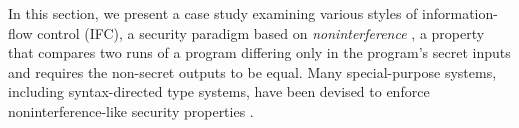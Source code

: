 \documentclass[sigplan,screen]{acmart}\settopmatter{}
\newcommand{\comm}[3]{\ifcheckpagebudget\else\ifdraft{\maybecolor{#1}[#2: #3]}\fi\fi}
\newcommand{\ch}[1]{\comm{teal}{CH}{#1}}
\begin{document}



In this section, we present a case study examining various styles of
information-flow control (IFC), a security paradigm based on
\emph{noninterference} \cite{goguen82security}, a property that
compares two runs of a program differing only in the program's secret
inputs and requires the non-secret outputs to be equal. Many
special-purpose systems, including syntax-directed type systems, have
been devised to enforce noninterference-like security properties
\cite[see, e.g.,][]{SabelfeldMyers06IFC, HedinS12}.
\end{document}
